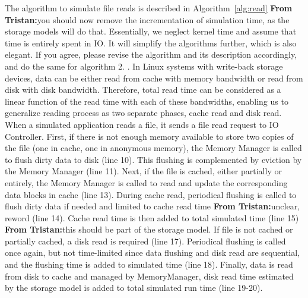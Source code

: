 \documentclass[conference]{IEEEtran}
\newcommand{\tristan}[1]{\color{orange}\textbf{From Tristan:}#1\color{black}}
\begin{document}
			The algorithm to simulate file reads is described in 
			Algorithm~\ref{alg:read} \tristan{you should now remove the incrementation of simulation time, as the storage models will do that.
			Essentially, we neglect kernel time and assume that time is entirely spent in IO. It will simplify the algorithms further, which is also elegant. If you 
			agree, please revise the algorithm and its description accordingly, and do the same for algorithm 2.
			}.  
			In Linux systems with write-back storage devices, data can be either read 
			from cache with memory bandwidth or read from disk with disk bandwidth. 
			Therefore, total read time can be considered as a linear function 
			of the read time with each of these bandwidths, 
			enabling us to generalize reading process as two separate phases, 
			cache read and disk read. 
			When a simulated application reads a file, 
			it sends a file read request to IO Controller. 
			First, if there  is not enough memory available to store two
			copies of the file (one in cache, one in anonymous memory), the
			Memory Manager is called to flush dirty data to disk (line 10).
			This flushing is complemented by eviction by the Memory Manager (line 11). 
			Next, if the file is cached, either partially or entirely, the Memory Manager is 
			called to read and update the corresponding data blocks in cache (line 13). 
			During cache read, periodical flushing is called to flush dirty data if needed 
			and limited to cache read time \tristan{unclear, reword} (line 14).
			Cache read time is then added to total simulated time (line 15) \tristan{this should be part of the storage model}. 
			If file is not cached or partially cached, a disk read is required (line 17). 
			Periodical flushing is called once again, but not time-limited since 
			data flushing and disk read are sequential, and the flushing time is 
			added to simulated time (line 18).
			Finally, data is read from disk to cache and managed by MemoryManager, 
			disk read time estimated by the storage model is added to 
			total simulated run time (line 19-20). 
\end{document}
